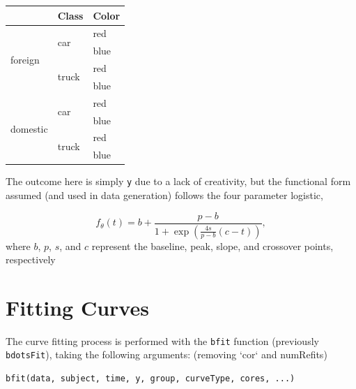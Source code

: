 \documentclass{article}
\newcommand{\xt}{\texttt}%
\begin{document}
\begin{center}

\begin{tabular}{|p{0.9in}|p{0.9in}|p{0.9in}|} \hline 
\rowcolor{lightgray} \multicolumn{1}{|c|}{Origin} & \multicolumn{1}{c|}{Class} & \multicolumn{1}{c|}{Color}\\
\hline
\multirow{4}{*}{foreign} & \multirow{2}{*}{car} & red \\
\hhline{~~-}
& & blue \\
\hhline{~--}
& \multirow{2}{*}{truck} & red \\
\hhline{~~-}
& & blue \\
\hline
\multirow{4}{*}{domestic} & \multirow{2}{*}{car} & red \\
\hhline{~~-}
& & blue \\
\hhline{~--}
& \multirow{2}{*}{truck} & red \\
\hhline{~~-}
& & blue \\
\hline
\end{tabular}
\end{center}

The outcome here is simply \xt{y} due to a lack of creativity, but the functional form assumed (and used in data generation) follows the four parameter logistic, 

\begin{equation}
f_{\theta}(t) = b + \frac{p-b}{1 + \exp \left( \frac{4s}{p-b} (c-t) \right)},
\end{equation}
where $b$, $p$, $s$, and $c$ represent the baseline, peak, slope, and crossover points, respectively


\section{Fitting Curves}

The curve fitting process is performed with the \texttt{bfit} function (previously \texttt{bdotsFit}), taking the following arguments: (removing `cor` and numRefits)

\begin{center}
\begin{verbatim}
bfit(data, subject, time, y, group, curveType, cores, ...)
\end{verbatim}
\end{center}
\end{document}
